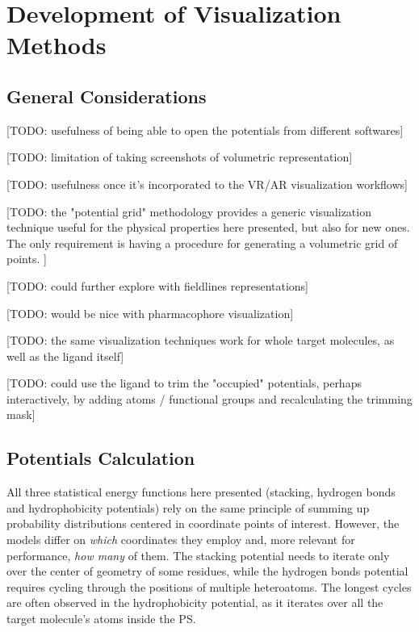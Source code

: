 \section{Development of Visualization Methods}
  \subsection{General Considerations}
    [TODO: usefulness of being able to open the potentials from different softwares]

    [TODO: limitation of taking screenshots of volumetric representation]

    [TODO: usefulness once it's incorporated to the VR/AR visualization workflows]

    [TODO: the "potential grid" methodology provides a generic visualization technique useful for the physical properties here presented, but also for new ones. The only requirement is having a procedure for generating a volumetric grid of points. ] %

    [TODO: could further explore with fieldlines representations]

    [TODO: would be nice with pharmacophore visualization]

    [TODO: the same visualization techniques work for whole target molecules, as well as the ligand itself]

    [TODO: could use the ligand to trim the "occupied" potentials, perhaps interactively, by adding atoms / functional groups and recalculating the trimming mask]

  \subsection{Potentials Calculation}
    All three statistical energy functions here presented (stacking, hydrogen bonds and hydrophobicity potentials) rely on the same principle of summing up probability distributions centered in coordinate points of interest. However, the models differ on \textit{which} coordinates they employ and, more relevant for performance, \textit{how many} of them. The stacking potential needs to iterate only over the center of geometry of some residues, while the hydrogen bonds potential requires cycling through the positions of multiple heteroatoms. The longest cycles are often observed in the hydrophobicity potential, as it iterates over all the target molecule's atoms inside the PS.

